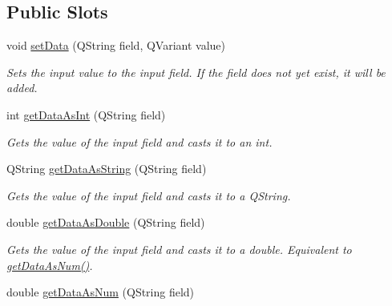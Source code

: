 \subsection*{Public Slots}
\begin{DoxyCompactItemize}
\item 
void \hyperlink{class_picto_1_1_operator_info_graphic_a0a634aa7f2aa22210dd940e41a844230}{set\-Data} (Q\-String field, Q\-Variant value)
\begin{DoxyCompactList}\small\item\em Sets the input value to the input field. If the field does not yet exist, it will be added. \end{DoxyCompactList}\item 
\hypertarget{class_picto_1_1_operator_info_graphic_a4b5e0972fba2789d9cd3f474f01743f1}{int \hyperlink{class_picto_1_1_operator_info_graphic_a4b5e0972fba2789d9cd3f474f01743f1}{get\-Data\-As\-Int} (Q\-String field)}\label{class_picto_1_1_operator_info_graphic_a4b5e0972fba2789d9cd3f474f01743f1}

\begin{DoxyCompactList}\small\item\em Gets the value of the input field and casts it to an int. \end{DoxyCompactList}\item 
\hypertarget{class_picto_1_1_operator_info_graphic_a4b862ab73a34658ef2b62d126d7e3bc6}{Q\-String \hyperlink{class_picto_1_1_operator_info_graphic_a4b862ab73a34658ef2b62d126d7e3bc6}{get\-Data\-As\-String} (Q\-String field)}\label{class_picto_1_1_operator_info_graphic_a4b862ab73a34658ef2b62d126d7e3bc6}

\begin{DoxyCompactList}\small\item\em Gets the value of the input field and casts it to a Q\-String. \end{DoxyCompactList}\item 
\hypertarget{class_picto_1_1_operator_info_graphic_a797a03c2301435cef3bbcae4b045e444}{double \hyperlink{class_picto_1_1_operator_info_graphic_a797a03c2301435cef3bbcae4b045e444}{get\-Data\-As\-Double} (Q\-String field)}\label{class_picto_1_1_operator_info_graphic_a797a03c2301435cef3bbcae4b045e444}

\begin{DoxyCompactList}\small\item\em Gets the value of the input field and casts it to a double. Equivalent to \hyperlink{class_picto_1_1_operator_info_graphic_af18a42da4948a7f49ecb6993ae580ea6}{get\-Data\-As\-Num()}. \end{DoxyCompactList}\item 
\hypertarget{class_picto_1_1_operator_info_graphic_af18a42da4948a7f49ecb6993ae580ea6}{double \hyperlink{class_picto_1_1_operator_info_graphic_af18a42da4948a7f49ecb6993ae580ea6}{get\-Data\-As\-Num} (Q\-String field)}\label{class_picto_1_1_operator_info_graphic_af18a42da4948a7f49ecb6993ae580ea6}


\end{DoxyCompactItemize}
